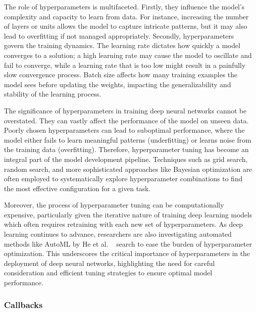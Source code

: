 \documentclass[12pt]{article}
\begin{document}
The role of hyperparameters is multifaceted. Firstly, they influence the model's complexity and capacity to learn from data. For instance, increasing the number of layers or units allows the model to capture intricate patterns, but it may also lead to overfitting if not managed appropriately. Secondly, hyperparameters govern the training dynamics. The learning rate dictates how quickly a model converges to a solution; a high learning rate may cause the model to oscillate and fail to converge, while a learning rate that is too low might result in a painfully slow convergence process. Batch size affects how many training examples the model sees before updating the weights, impacting the generalizability and stability of the learning process.

The significance of hyperparameters in training deep neural networks cannot be overstated. They can vastly affect the performance of the model on unseen data. Poorly chosen hyperparameters can lead to suboptimal performance, where the model either fails to learn meaningful patterns (underfitting) or learns noise from the training data (overfitting). Therefore, hyperparameter tuning has become an integral part of the model development pipeline. Techniques such as grid search, random search, and more sophisticated approaches like Bayesian optimization are often employed to systematically explore hyperparameter combinations to find the most effective configuration for a given task.

Moreover, the process of hyperparameter tuning can be computationally expensive, particularly given the iterative nature of training deep learning models which often requires retraining with each new set of hyperparameters. As deep learning continues to advance, researchers are also investigating automated methods like AutoML by He et al. ~\cite{he2021automl} search to ease the burden of hyperparameter optimization. This underscores the critical importance of hyperparameters in the deployment of deep neural networks, highlighting the need for careful consideration and efficient tuning strategies to ensure optimal model performance.

\subsubsection{Callbacks}
\end{document}
